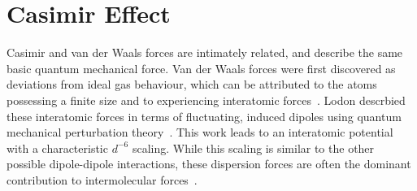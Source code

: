 

\section{Casimir Effect}
\label{sec:casimir}
Casimir and van der Waals forces are intimately related, and describe the same basic quantum mechanical force. 
Van der Waals forces were first discovered as deviations from ideal gas behaviour, which can be attributed 
to the atoms possessing a finite size and to experiencing interatomic forces~\cite{vanderWaals,Parsegian2006}.
Lodon descrbied these interatomic forces in terms of fluctuating, induced dipoles using quantum mechanical perturbation
 theory~\cite{London1930}.  This work leads to an interatomic potential with a characteristic $d^{-6}$ scaling.
While this scaling is similar to the other possible dipole-dipole interactions, these dispersion forces are often the dominant contribution
to intermolecular forces~\cite{Israelachvili2011}.

